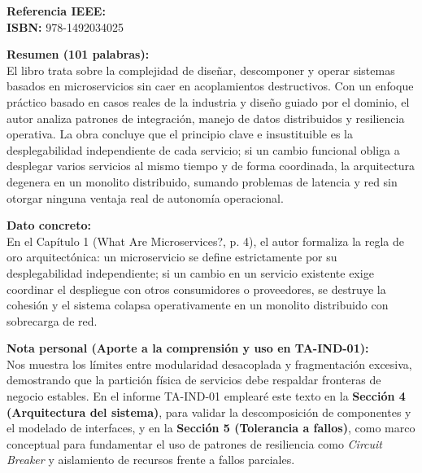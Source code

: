 \documentclass[11pt,a4paper]{article}
\begin{document}
\vspace{0.4cm}

\begin{tcolorbox}[colback=white,colframe=black!75!black,title=\textbf{Ficha Bibliográfica 4: Libro Canónico (O'Reilly Media)}]
\textbf{Referencia IEEE:} \cite{ref4_building_microservices} \\
\textbf{ISBN:} 978-1492034025

\vspace{0.2cm}
\textbf{Resumen (101 palabras):} \\
El libro trata sobre la complejidad de diseñar, descomponer y operar sistemas basados en microservicios sin caer en acoplamientos destructivos. Con un enfoque práctico basado en casos reales de la industria y diseño guiado por el dominio, el autor analiza patrones de integración, manejo de datos distribuidos y resiliencia operativa. La obra concluye que el principio clave e insustituible es la desplegabilidad independiente de cada servicio; si un cambio funcional obliga a desplegar varios servicios al mismo tiempo y de forma coordinada, la arquitectura degenera en un monolito distribuido, sumando problemas de latencia y red sin otorgar ninguna ventaja real de autonomía operacional.

\vspace{0.2cm}
\textbf{Dato concreto:} \\
En el Capítulo 1 (What Are Microservices?, p. 4), el autor formaliza la regla de oro arquitectónica: un microservicio se define estrictamente por su desplegabilidad independiente; si un cambio en un servicio existente exige coordinar el despliegue con otros consumidores o proveedores, se destruye la cohesión y el sistema colapsa operativamente en un monolito distribuido con sobrecarga de red.

\vspace{0.2cm}
\textbf{Nota personal (Aporte a la comprensión y uso en TA-IND-01):} \\
Nos muestra los límites entre modularidad desacoplada y fragmentación excesiva, demostrando que la partición física de servicios debe respaldar fronteras de negocio estables. En el informe TA-IND-01 emplearé este texto en la \textbf{Sección 4 (Arquitectura del sistema)}, para validar la descomposición de componentes y el modelado de interfaces, y en la \textbf{Sección 5 (Tolerancia a fallos)}, como marco conceptual para fundamentar el uso de patrones de resiliencia como \textit{Circuit Breaker} y aislamiento de recursos frente a fallos parciales.
\end{tcolorbox}
\end{document}
